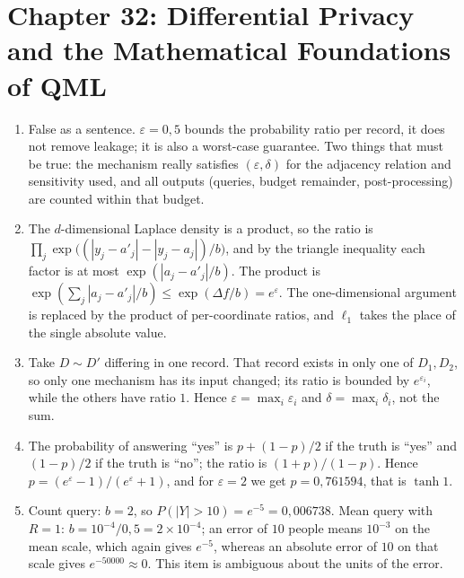 \section*{Chapter 32: Differential Privacy and the Mathematical Foundations of QML}
\begin{enumerate}[label=\textbf{32.\arabic*}]
  \item False as a sentence. $\varepsilon=0{,}5$ bounds the probability ratio per
        record, it does not remove leakage; it is also a worst-case guarantee. Two things
        that must be true: the mechanism really satisfies $(\varepsilon,\delta)$ for
        the adjacency relation and sensitivity used, and all outputs
        (queries, budget remainder, post-processing) are counted within that budget.

  \item The $d$-dimensional Laplace density is a product, so the ratio is
        $\prod_{j}\exp\bigl((|y_{j}-a'_{j}|-|y_{j}-a_{j}|)/b\bigr)$, and by the
        triangle inequality each factor is at most
        $\exp(|a_{j}-a'_{j}|/b)$. The product is
        $\exp(\sum_{j}|a_{j}-a'_{j}|/b)\le\exp(\Delta f/b)=e^{\varepsilon}$.
        The one-dimensional argument is replaced by the product of per-coordinate ratios, and
        $\ell_1$ takes the place of the single absolute value.

  \item Take $D\sim D'$ differing in one record. That record exists in only
        one of $D_{1},D_{2}$, so only one mechanism has its input changed;
        its ratio is bounded by $e^{\varepsilon_{i}}$, while the others have ratio $1$.
        Hence $\varepsilon=\max_{i}\varepsilon_{i}$ and
        $\delta=\max_{i}\delta_{i}$, not the sum.

  \item The probability of answering ``yes'' is $p+(1-p)/2$ if the truth is ``yes'' and $(1-p)/2$
        if the truth is ``no''; the ratio is $(1+p)/(1-p)$. Hence
        $p=(e^{\varepsilon}-1)/(e^{\varepsilon}+1)$, and for $\varepsilon=2$
        we get $p=0{,}761594$, that is $\tanh1$.

  \item Count query: $b=2$, so $P(|Y|>10)=e^{-5}=0{,}006738$. Mean query
        with $R=1$: $b=10^{-4}/0{,}5=2\times10^{-4}$; an error of $10$ people means
        $10^{-3}$ on the mean scale, which again gives $e^{-5}$, whereas an
        absolute error of $10$ on that scale gives $e^{-50000}\approx0$. This item is
        ambiguous about the units of the error.


\end{enumerate}
